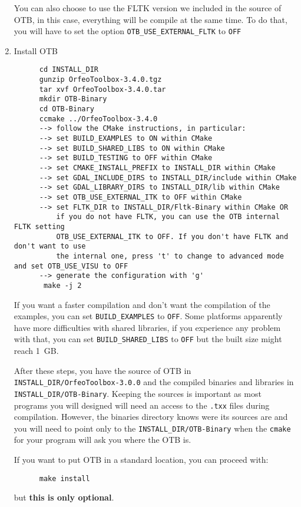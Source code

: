 \begin{enumerate}
   You can also choose to use the FLTK version we included in the source of OTB, in this case, everything will be compile at the same time. To do that, you will have to set the option \texttt{OTB\_USE\_EXTERNAL\_FLTK} to \texttt{OFF}

\item Install OTB
  \begin{verbatim}
      cd INSTALL_DIR
      gunzip OrfeoToolbox-3.4.0.tgz
      tar xvf OrfeoToolbox-3.4.0.tar
      mkdir OTB-Binary
      cd OTB-Binary
      ccmake ../OrfeoToolbox-3.4.0
      --> follow the CMake instructions, in particular:
	  --> set BUILD_EXAMPLES to ON within CMake
	  --> set BUILD_SHARED_LIBS to ON within CMake
	  --> set BUILD_TESTING to OFF within CMake
	  --> set CMAKE_INSTALL_PREFIX to INSTALL_DIR within CMake
	  --> set GDAL_INCLUDE_DIRS to INSTALL_DIR/include within CMake
	  --> set GDAL_LIBRARY_DIRS to INSTALL_DIR/lib within CMake
	  --> set OTB_USE_EXTERNAL_ITK to OFF within CMake
	  --> set FLTK_DIR to INSTALL_DIR/Fltk-Binary within CMake OR
	      if you do not have FLTK, you can use the OTB internal FLTK setting  
	      OTB_USE_EXTERNAL_ITK to OFF. If you don't have FLTK and don't want to use 
	      the internal one, press 't' to change to advanced mode and set OTB_USE_VISU to OFF
	  --> generate the configuration with 'g'
       make -j 2
  \end{verbatim}

  If you want a faster compilation and don't want the compilation of the examples, you
  can set \texttt{BUILD\_EXAMPLES} to \texttt{OFF}. Some platforms apparently
  have more difficulties with shared libraries, if you experience any problem
  with that, you can set \texttt{BUILD\_SHARED\_LIBS} to \texttt{OFF} but the
  built size might reach 1~GB.

  After these steps, you have the source of OTB in \texttt{INSTALL\_DIR/OrfeoToolbox-3.0.0}
  and the compiled binaries and libraries in \texttt{INSTALL\_DIR/OTB-Binary}. Keeping
  the sources is important as most programs you will designed will need an access
  to the \texttt{.txx} files during compilation. However, the binaries directory knows were
  its sources are and you will need to point only to the \texttt{INSTALL\_DIR/OTB-Binary}
  when the \texttt{cmake} for your program will ask you where the OTB is.

  If you want to put OTB in a standard location, you can proceed with:

  \begin{verbatim}
      make install
  \end{verbatim}

  but \textbf{this is only optional}.


\end{enumerate}

